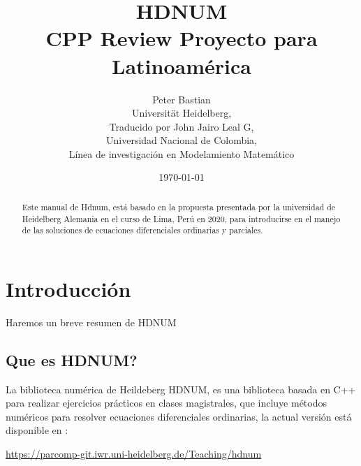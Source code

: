 \usepackage{amsfonts}
\usepackage{amscd}
\usepackage{grffile}
\usepackage{tikz}
\usetikzlibrary{3d,calc}
\usepackage{eurosym}
\usepackage{graphicx}
\usepackage{color}
\usepackage{listings}
\usepackage{paralist}
\usepackage{curves}
\usepackage{calc}
\usepackage{picinpar}
\usepackage{enumerate}
\usepackage{algpseudocode}
\usepackage{bm}
\usepackage{multibib}
\usepackage{hyperref}
\usepackage{textcase}
\usepackage{nicefrac}
\usepackage[titletoc,toc,title]{appendix}

\theoremstyle{definition}
\newtheorem{exm}{Example}
\newtheorem{thm}{Theorem}
\newtheorem{cor}{Corollary}
\newtheorem{obs}{Observation}

\title{HDNUM\\ CPP Review Proyecto para Latinoamérica}
\author{Peter Bastian\\
  Universität Heidelberg, \\
  Traducido por John Jairo Leal G,\\
  Universidad Nacional de Colombia, \\
  Línea de investigación en Modelamiento Matemático\\
}
\date{\today}



\maketitle



\begin{abstract}
Este manual de Hdnum, está basado en la propuesta presentada por la universidad de 
Heidelberg Alemania en el curso de Lima, Perú en 2020, para introducirse en el manejo de las soluciones de ecuaciones
diferenciales ordinarias y parciales.
\end{abstract}


\section{Introducción}
Haremos un breve resumen de HDNUM
\subsection{Que es HDNUM?}
La biblioteca numérica de Heildeberg HDNUM, es una biblioteca basada en C++ para realizar ejercicios prácticos en clases
magistrales, que incluye métodos numéricos para resolver ecuaciones diferenciales ordinarias, la actual versión está 
disponible en :
\begin{center}
\url{https://parcomp-git.iwr.uni-heidelberg.de/Teaching/hdnum}
\end{center}


